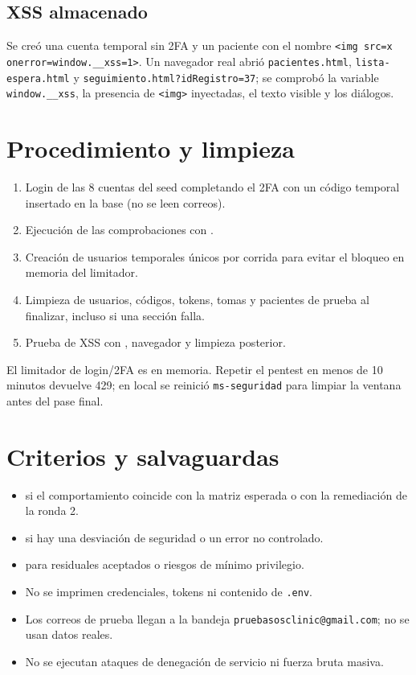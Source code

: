 \documentclass[11pt]{article}
\begin{document}
\subsection{XSS almacenado}

Se creó una cuenta temporal sin 2FA y un paciente con el nombre
\texttt{<img src=x onerror=window.\_\_xss=1>}. Un navegador real abrió
\texttt{pacientes.html}, \texttt{lista-espera.html} y
\texttt{seguimiento.html?idRegistro=37}; se comprobó la variable
\texttt{window.\_\_xss}, la presencia de \texttt{<img>} inyectadas, el texto
visible y los diálogos.

\section{Procedimiento y limpieza}

\begin{enumerate}
  \item Login de las 8 cuentas del seed completando el 2FA con un código
  temporal insertado en la base (no se leen correos).
  \item Ejecución de las comprobaciones con .
  \item Creación de usuarios temporales únicos por corrida para evitar el
  bloqueo en memoria del limitador.
  \item Limpieza de usuarios, códigos, tokens, tomas y pacientes de prueba al
  finalizar, incluso si una sección falla.
  \item Prueba de XSS con , navegador y limpieza
  posterior.
\end{enumerate}

El limitador de login/2FA es en memoria. Repetir el pentest en menos de 10
minutos devuelve 429; en local se reinició \texttt{ms-seguridad} para limpiar la
ventana antes del pase final.

\section{Criterios y salvaguardas}

\begin{itemize}
  \item \ok{} si el comportamiento coincide con la matriz esperada o con la
  remediación de la ronda 2.
  \item \fallo{} si hay una desviación de seguridad o un error no controlado.
  \item \aviso{} para residuales aceptados o riesgos de mínimo privilegio.
  \item No se imprimen credenciales, tokens ni contenido de \texttt{.env}.
  \item Los correos de prueba llegan a la bandeja
  \texttt{pruebasosclinic@gmail.com}; no se usan datos reales.
  \item No se ejecutan ataques de denegación de servicio ni fuerza bruta masiva.
\end{itemize}
\end{document}
